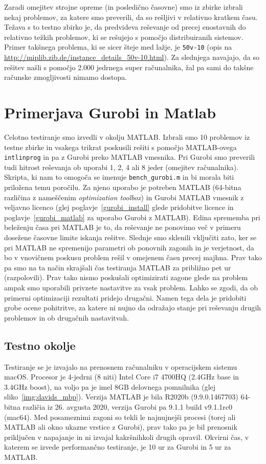 \documentclass[a4paper,11pt]{article}
\begin{document}
Zaradi omejitev strojne opreme (in posledično časovne) smo iz zbirke izbrali nekaj problemov, za katere smo preverili, da so rešljivi v relativno kratkem času. Težava s to testno zbirko je, da predvideva reševanje od precej enostavnih do relativno težkih problemov, ki se rešujejo s pomočjo distribuiranih sistemov. Primer takšnega problema, ki se sicer šteje med lažje, je \texttt{50v-10} (opis na  \url{http://miplib.zib.de/instance_details_50v-10.html}). Za slednjega navajajo, da so rešitev našli s pomočjo 2.000 jedrnega super računalnika, žal pa sami do takšne računske zmogljivosti nimamo dostopa.

\section{Primerjava Gurobi in Matlab}
Celotno testiranje smo izvedli v okolju MATLAB. Izbrali smo 10 problemov iz testne zbirke in vsakega trikrat poskusili rešiti s pomočjo MATLAB-ovega \texttt{intlinprog} in pa z Gurobi preko MATLAB vmesnika. Pri Gurobi smo preverili tudi hitrost reševanja ob uporabi 1, 2, 4 ali 8 jeder (omejitev računalnika). Skripta, ki nam to omogoča se imenuje \texttt{bench\_gurobi.m} in bi morala biti priložena temu poročilu. Za njeno uporabo je potreben MATLAB (64-bitna različina z nameščenim \textit{optimization toolbox}) in Gurobi MATLAB vmesnik z veljavno licenco (glej poglavje~\ref{gurobi_install} glede pridobitve licence in poglavje~\ref{gurobi_matlab} za uporabo Gurobi z MATLAB). Edina sprememba pri beleženju časa pri MATLAB je to, da reševanje ne ponovimo več v primeru dosežene časovne limite iskanja rešitve. Slednje smo sklenili vključiti zato, ker se pri MATLAB ne spremenijo parametri ob ponovnih zagonih in je verjetnost, da bo v vnovičnem poskusu problem rešil v omejenem času precej majhna. Prav tako pa smo na ta način skrajšali čas testiranja MATLAB za približno pet ur (razpolovili). Prav tako nismo poskušali optimizirati zagone glede na problem ampak smo uporabili privzete nastavitve za vsak problem. Lahko se zgodi, da ob primerni optimizaciji rezultati pridejo drugačni. Namen tega dela je pridobiti grobe ocene pohitritve, za katere ni nujno da odražajo stanje pri reševanju drugih problemov in ob drugačnih nastavitvah.

\subsection{Testno okolje}
Testiranje se je izvajalo na prenosnem računalniku v operacijskem sistemu macOS. Procesor je 4-jedrni (8 niti) Intel Core i7 4700HQ (2.4GHz base in 3.4GHz boost), na voljo pa je imel 8GB delovnega pomnilnika (glej sliko~\ref{img:davids_mbp}). Verzija MATLAB je bila R2020b (9.9.0.1467703) 64-bitna različia iz 26. avgusta 2020, verzija Gurobi pa 9.1.1 build v9.1.1rc0 (mac64). Med posameznimi zagoni so tekli le najnujnejši procesi (torej ali MATLAB ali okno ukazne vrstice z Gurobi), prav tako pa je bil prenosnik priključen v napajanje in ni izvajal kakršnihkoli drugih opravil. Okvirni čas, v katerem se izvede performančno testiranje, je 10 ur za Gurobi in 5 ur za MATLAB. 
\end{document}
